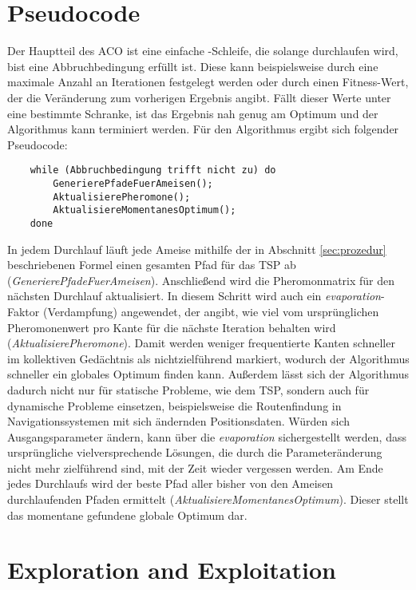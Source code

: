 \section{Pseudocode}

Der Hauptteil des ACO ist eine einfache -Schleife, die solange
durchlaufen wird, bist eine Abbruchbedingung erfüllt ist. Diese kann
beispielsweise durch eine maximale Anzahl an Iterationen festgelegt werden
oder durch einen Fitness-Wert, der die Veränderung zum vorherigen Ergebnis
angibt. Fällt dieser Werte unter eine bestimmte Schranke, ist das Ergebnis
nah genug am Optimum und der Algorithmus kann terminiert werden.
Für den Algorithmus ergibt sich folgender Pseudocode:

\begin{lstlisting}
    while (Abbruchbedingung trifft nicht zu) do
        GenerierePfadeFuerAmeisen();
        AktualisierePheromone();
        AktualisiereMomentanesOptimum();
    done
\end{lstlisting}

In jedem Durchlauf läuft jede Ameise mithilfe der in Abschnitt
\ref{sec:prozedur} beschriebenen Formel einen gesamten Pfad für das TSP ab
(\emph{GenerierePfadeFuerAmeisen}).
Anschließend wird die Pheromonmatrix für den nächsten Durchlauf aktualisiert.
In diesem Schritt wird auch ein \emph{evaporation}-Faktor (Verdampfung)
angewendet, der angibt, wie viel vom ursprünglichen Pheromonenwert pro
Kante für die nächste Iteration behalten wird (\emph{AktualisierePheromone}).
Damit werden weniger
frequentierte Kanten schneller im kollektiven Gedächtnis als
nichtzielführend markiert, wodurch der Algorithmus schneller ein globales
Optimum finden kann.
Außerdem lässt sich der Algorithmus dadurch nicht nur für statische Probleme,
wie dem TSP, sondern auch für dynamische Probleme einsetzen, beispielsweise
die Routenfindung in Navigationssystemen mit sich ändernden Positionsdaten.
Würden sich Ausgangsparameter ändern, kann über die \emph{evaporation}
sichergestellt werden, dass ursprüngliche vielversprechende Lösungen, die
durch die Parameteränderung nicht mehr zielführend sind, mit der Zeit wieder
vergessen werden.
Am Ende jedes Durchlaufs wird der beste Pfad aller bisher von den Ameisen
durchlaufenden Pfaden ermittelt (\emph{AktualisiereMomentanesOptimum}).
Dieser stellt das momentane gefundene globale Optimum dar.

\section{Exploration and Exploitation}

